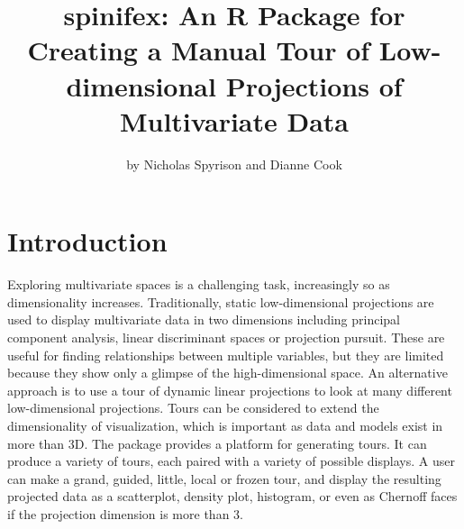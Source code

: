 \title{spinifex: An R Package for Creating a Manual Tour of Low-dimensional
Projections of Multivariate Data}
\author{by Nicholas Spyrison and Dianne Cook}

\maketitle


\hypertarget{introduction}{%
\section{Introduction}\label{introduction}}

Exploring multivariate spaces is a challenging task, increasingly so as
dimensionality increases. Traditionally, static low-dimensional
projections are used to display multivariate data in two dimensions
including principal component analysis, linear discriminant spaces or
projection pursuit. These are useful for finding relationships between
multiple variables, but they are limited because they show only a
glimpse of the high-dimensional space. An alternative approach is to use
a tour \citep{asimov_grand_1985} of dynamic linear projections to look
at many different low-dimensional projections. Tours can be considered
to extend the dimensionality of visualization, which is important as
data and models exist in more than 3D. The package 
\citep{wickham_tourr:_2011} provides a platform for generating tours. It
can produce a variety of tours, each paired with a variety of possible
displays. A user can make a grand, guided, little, local or frozen tour,
and display the resulting projected data as a scatterplot, density plot,
histogram, or even as Chernoff faces if the projection dimension is more
than 3.

